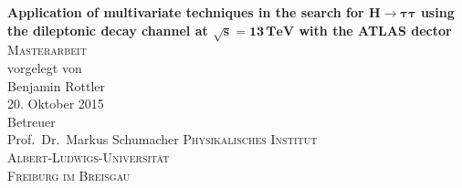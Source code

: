 \begin{titlepage}
\begin{center}
    {\huge \textbf{Application of multivariate techniques in the search for $\bm{H \to \tau\tau}$ using the dileptonic decay channel at $\bm{\sqrt{s} = 13\,\text{TeV}}$ with the ATLAS dector}}\\[2cm]

	\textsc{\LARGE Masterarbeit}\\[2cm]

    {\large vorgelegt von}\\[0.5cm]
    {\Large Benjamin Rottler} \\[0.5cm]
    {\large 20. Oktober 2015} \\[2cm]

    {\large Betreuer}\\[0.5cm]
    {\Large Prof.\ Dr.\ Markus Schumacher}
  	\vfill
	\large
	\textsc{Physikalisches Institut} \\
	\textsc{Albert-Ludwigs-Universität} \\
	\textsc{Freiburg im Breisgau} \\[1cm]
\end{center}
\end{titlepage}
